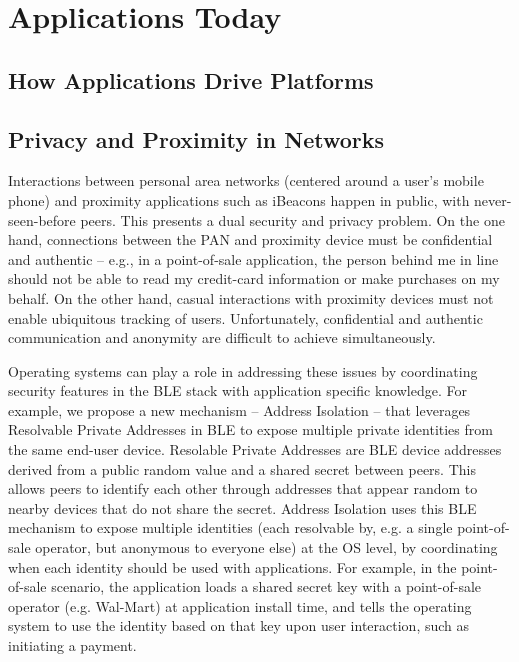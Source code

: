 \section{Applications Today}

\subsection{How Applications Drive Platforms}

\glipsum[1-2]

\subsection{Privacy and Proximity in Networks}

Interactions between personal area networks (centered around a user’s mobile
phone) and proximity applications such as iBeacons happen in public, with
never-seen-before peers. This presents a dual security and privacy problem. On
the one hand, connections between the PAN and proximity device must be
confidential and authentic -- e.g., in a point-of-sale application, the person
behind me in line should not be able to read my credit-card information or
make purchases on my behalf. On the other hand, casual interactions with
proximity devices must not enable ubiquitous tracking of users. Unfortunately,
confidential and authentic communication and anonymity are difficult to
achieve simultaneously.

Operating systems can play a role in addressing these issues by coordinating
security features in the BLE stack with application specific knowledge. For
example, we propose a new mechanism -- Address Isolation -- that leverages
Resolvable Private Addresses in BLE to expose multiple private identities from
the same end-user device. Resolable Private Addresses are BLE device addresses
derived from a public random value and a shared secret between peers. This
allows peers to identify each other through addresses that appear random to
nearby devices that do not share the secret. Address Isolation uses this BLE
mechanism to expose multiple identities (each resolvable by, e.g. a single
point-of-sale operator, but anonymous to everyone else) at the OS level, by
coordinating when each identity should be used with applications. For example,
in the point-of-sale scenario, the application loads a shared secret key with
a point-of-sale operator (e.g. Wal-Mart) at application install time, and
tells the operating system to use the identity based on that key upon user
interaction, such as initiating a payment.

